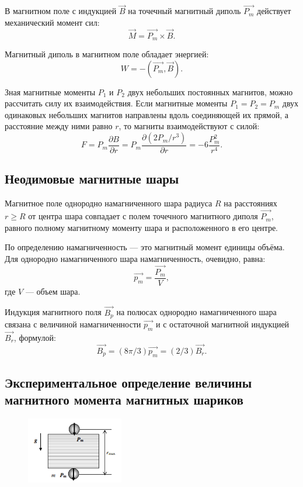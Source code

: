 \documentclass[a4paper]{article}
\theoremstyle{definition}
\theoremstyle{remark}
\begin{document}
 В магнитном поле с индукцией $\vec{B}$ на точечный магнитный диполь $\vec{P_m}$ действует механический момент сил: $$\vec{M} = \vec{P_m} \times \vec{B}.$$
 
 Магнитный диполь в магнитном поле обладает энергией: $$W = -(\vec{P_m}, \vec{B}).$$
 
 Зная магнитные моменты $P_1$ и $P_2$ двух небольших постоянных магнитов, можно рассчитать силу их взаимодействия. Если магнитные моменты $P_1 = P_2 = P_m$ двух одинаковых небольших магнитов направлены вдоль соединяющей их прямой, а расстояние между ними равно $r$, то магниты взаимодействуют с силой: $$F = P_m \frac{\partial B}{\partial r} = P_m \frac{\partial (2P_m / r^3)}{\partial r} = -6\frac{P_{m}^{2}}{r^4}.$$
 
\subsection{Неодимовые магнитные шары}

Магнитное поле однородно намагниченного шара радиуса $R$ на расстояниях $r \geq R$ от центра шара совпадает с полем точечного магнитного диполя $\vec{P_m}$, равного полному магнитному моменту шара и расположенного в его центре.

По определению намагниченность --- это магнитный момент единицы объёма. Для однородно намагниченного шара намагниченность, очевидно, равна: $$\vec{p_m} = \frac{\vec{P_m}}{V},$$ где $V$ --- объем шара.

Индукция магнитного поля $\vec{B_p}$ на полюсах однородно намагниченного шара связана с величиной намагниченности $\vec{p_m}$ и с остаточной магнитной индукцией $\vec{B_r}$, формулой: $$\vec{B_p} = (8\pi/3)\vec{p_m} = (2/3)\vec{B_r}.$$


\subsection{Экспериментальное определение величины магнитного момента магнитных шариков}


\begin{figure}
    \centering
    \includegraphics[width = 120pt]{image/pic1.png}
\end{figure}
\end{document}

